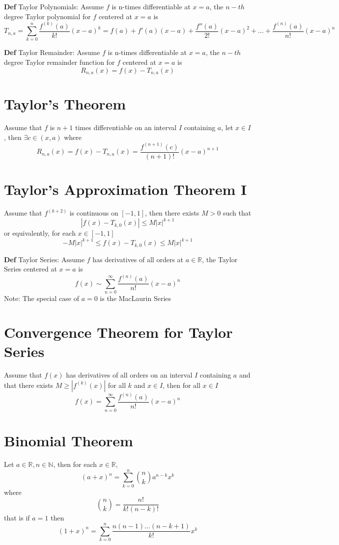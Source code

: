 \documentclass[11pt,notitlepage]{report}
\begin{document}
\textbf{Def} Taylor Polynomials: Assume $f$ is n-times differentiable at $x = a$, the $n-th$ degree Taylor polynomial for $f$ centered at $x=a$ is
$$T_{n,a} = \sum_{k=0}^n \frac{f^{(k)}(a)}{k!}(x-a)^k = f(a) + f'(a)(x-a) + \frac{f''(a)}{2!}(x-a)^2 + \dots + \frac{f^{(n)}(a)}{n!}(x-a)^n$$

\textbf{Def} Taylor Remainder: Assume $f$ is n-times differentiable at $x = a$, the $n-th$ degree Taylor remainder function for $f$ centered at $x=a$ is
$$R_{n,a}(x) = f(x) - T_{n,a}(x)$$

\section{Taylor's Theorem}Assume that $f$ is $n+1$ times differentiable on an interval $I$ containing $a$, let $x \in I$, then $\exists c \in (x, a)$ where
$$R_{n,a}(x) = f(x) - T_{n,a}(x) = \frac{f^{(n+1)}(c)}{(n+1)!}(x-a)^{n+1}$$

\section{Taylor's Approximation Theorem I}Assume that $f^{(k+2)}$ is continuous on $[-1, 1]$, then there exists $M > 0$ such that
$$|f(x) - T_{k, 0}(x)| \leq M |x|^{k+1}$$
or equivalently, for each $x \in [-1, 1]$
$$-M|x|^{k+1} \leq f(x) - T_{k, 0}(x) \leq M |x|^{k+1}$$

\textbf{Def} Taylor Series: Assume $f$ has derivatives of all orders at $a \in \mathbb R$, the Taylor Series centered at $x=a$ is
$$f(x) \sim \sum_{n=0}^\infty \frac{f^{(n)}(a)}{n!}(x-a)^n$$
\hspace*{5mm} Note: The special case of $a=0$ is the MacLaurin Series

\section{Convergence Theorem for Taylor Series}Assume that $f(x)$ has derivatives of all orders on an interval $I$ containing $a$ and that there exists $M \geq |f^{(k)}(x)|$ for all $k$ and $x \in I$, then for all $x \in I$
$$f(x) = \sum_{n=0}^\infty \frac{f^{(n)}(a)}{n!} (x-a)^n$$

\section{Binomial Theorem}Let $a \in \mathbb R, n \in \mathbb N$, then for each $x \in \mathbb R$,
$$(a+x)^n = \sum_{k=0}^n \binom{n}{k} a^{n-k}x^k$$where$$\binom{n}{k} = \frac{n!}{k!(n-k)!}$$that is if $a=1$ then
$$(1+x)^n = \sum_{k=0}^n \frac{n(n-1)\dots(n-k+1)}{k!}x^k$$
\end{document}
